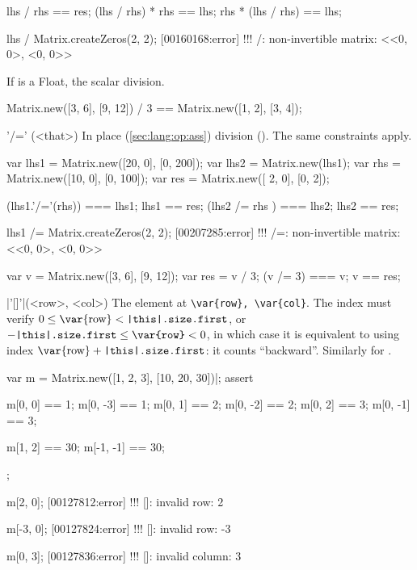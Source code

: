 \begin{urbiscriptapi}
\begin{urbiassert}
lhs / rhs == res;
(lhs / rhs) * rhs == lhs;
rhs * (lhs / rhs) == lhs;

lhs / Matrix.createZeros(2, 2);
[00160168:error] !!! /: non-invertible matrix: <<0, 0>, <0, 0>>
\end{urbiassert}

  If \that is a Float, the scalar division.
\begin{urbiassert}
Matrix.new([3, 6], [9, 12]) / 3 == Matrix.new([1, 2], [3, 4]);
\end{urbiassert}



\item['/='](<that>)%
  In place (\autoref{sec:lang:op:ass}) division ().  The same
  constraints apply.
\begin{urbiassert}
var lhs1 = Matrix.new([20, 0], [0, 200]);
var lhs2 = Matrix.new(lhs1);
var rhs = Matrix.new([10, 0], [0, 100]);
var res = Matrix.new([ 2, 0], [0,   2]);

(lhs1.'/='(rhs)) === lhs1;  lhs1 == res;
(lhs2  /=  rhs ) === lhs2;  lhs2 == res;

lhs1 /= Matrix.createZeros(2, 2);
[00207285:error] !!! /=: non-invertible matrix: <<0, 0>, <0, 0>>
\end{urbiassert}

\begin{urbiassert}
var v = Matrix.new([3, 6], [9, 12]);
var res = v / 3;
(v /= 3) === v; v == res;
\end{urbiassert}


\item|'[]'|(<row>, <col>)%
  The element at \lstinline|\var{row}, \var{col}|.  The index  must
  verify $0 \le \textrm{\var{row}} < \texttt{\this.size.first}$, or
  $-\texttt{\this.size.first} \le \texttt{\var{row}} < 0$, in which case it
  is equivalent to using index $\textrm{\var{row}} +
  \texttt{\this.size.first}$: it counts ``backward''.  Similarly for
  .
\begin{urbiscript}
var m = Matrix.new([1, 2, 3], [10, 20, 30])|;
assert
{
  m[0, 0] == 1;   m[0, -3] == 1;
  m[0, 1] == 2;   m[0, -2] == 2;
  m[0, 2] == 3;   m[0, -1] == 3;

  m[1, 2] == 30;  m[-1, -1] == 30;
};

m[2, 0];
[00127812:error] !!! []: invalid row: 2

m[-3, 0];
[00127824:error] !!! []: invalid row: -3

m[0, 3];
[00127836:error] !!! []: invalid column: 3


\end{urbiscript}
\end{urbiscriptapi}
